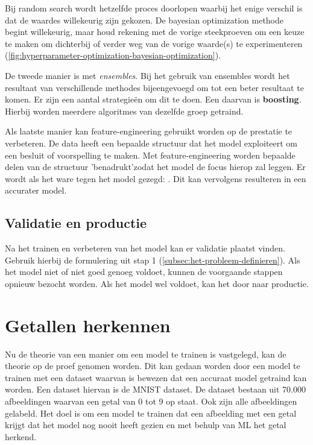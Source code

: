 Bij random search wordt hetzelfde proces doorlopen waarbij het enige verschil is dat de waardes willekeurig zijn gekozen. De bayesian optimization methode begint willekeurig, maar houd rekening met de vorige steekproeven om een keuze te maken om dichterbij of verder weg van de vorige waarde(s) te experimenteren (\autoref{fig:hyperparameter-optimization-bayesian-optimization}).

De tweede manier is met \textit{ensembles}. Bij het gebruik van ensembles wordt het resultaat van verschillende methodes bijeengevoegd om tot een beter resultaat te komen. Er zijn een aantal strategieën om dit te doen. Een daarvan is \textbf{boosting}. Hierbij worden meerdere algoritmes van dezelfde groep getraind.

Als laatste manier kan \gls{feature-engineering} gebruikt worden op de prestatie te verbeteren. De data heeft een bepaalde structuur dat het model exploiteert om een besluit of voorspelling te maken. Met \gls{feature-engineering} worden bepaalde delen van de structuur 'benadrukt'\space zodat het model de focus hierop zal leggen. Er wordt als het ware tegen het model gezegd: . Dit kan vervolgens resulteren in een accurater model.

\subsection{Validatie en productie}\label{subsec:validatie-en-productie}
Na het trainen en verbeteren van het model kan er validatie plaatst vinden. Gebruik hierbij de formulering uit stap 1 (\autoref{subsec:het-probleem-definieren}). Als het model niet of niet goed genoeg voldoet, kunnen de voorgaande stappen opnieuw bezocht worden. Als het model wel voldoet, kan het door naar productie.

\section{Getallen herkennen}\label{sec:getallen-herkennen}
Nu de theorie van een manier om een model te trainen is vastgelegd, kan de theorie op de proef genomen worden. Dit kan gedaan worden door een model te trainen met een dataset waarvan is bewezen dat een accuraat model getraind kan worden. Een dataset hiervan is de MNIST dataset. De dataset bestaan uit 70.000 afbeeldingen waarvan een getal van 0 tot 9 op staat. Ook zijn alle afbeeldingen gelabeld. Het doel is om een model te trainen dat een afbeelding met een getal krijgt dat het model nog nooit heeft gezien en met behulp van ML het getal herkend.

